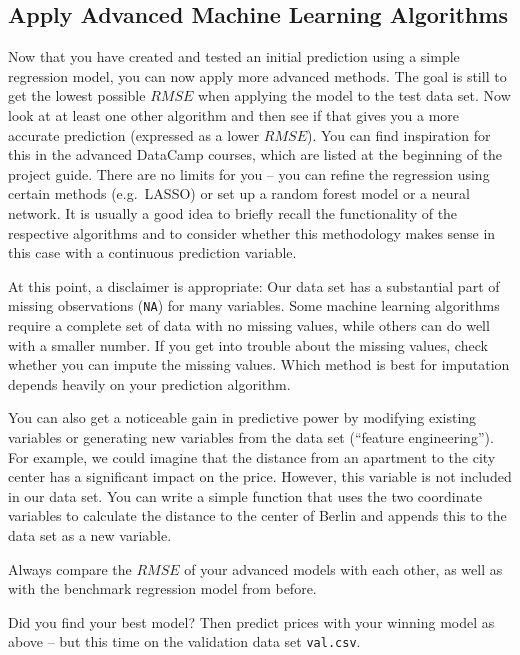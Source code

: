 \documentclass[
  11pt,
]{article}
\begin{document}
\hypertarget{apply-advanced-machine-learning-algorithms}{%
\subsection{Apply Advanced Machine Learning Algorithms}\label{apply-advanced-machine-learning-algorithms}}

Now that you have created and tested an initial prediction using a simple regression model, you can now apply more advanced methods. The goal is still to get the lowest possible \(RMSE\) when applying the model to the test data set. Now look at at least one other algorithm and then see if that gives you a more accurate prediction (expressed as a lower \(RMSE\)). You can find inspiration for this in the advanced DataCamp courses, which are listed at the beginning of the project guide. There are no limits for you -- you can refine the regression using certain methods (e.g.~LASSO) or set up a random forest model or a neural network. It is usually a good idea to briefly recall the functionality of the respective algorithms and to consider whether this methodology makes sense in this case with a continuous prediction variable.

At this point, a disclaimer is appropriate: Our data set has a substantial part of missing observations (\texttt{NA}) for many variables. Some machine learning algorithms require a complete set of data with no missing values, while others can do well with a smaller number. If you get into trouble about the missing values, check whether you can impute the missing values. Which method is best for imputation depends heavily on your prediction algorithm.

You can also get a noticeable gain in predictive power by modifying existing variables or generating new variables from the data set (``feature engineering''). For example, we could imagine that the distance from an apartment to the city center has a significant impact on the price. However, this variable is not
included in our data set. You can write a simple function that uses the two coordinate variables to calculate the distance to the center of Berlin and appends this to the data set as a new variable.

Always compare the \(RMSE\) of your advanced models with each other, as well as with the benchmark regression model from before.

Did you find your best model? Then predict prices with your winning model as above -- but this time on the validation data set \texttt{val.csv}.
\end{document}
